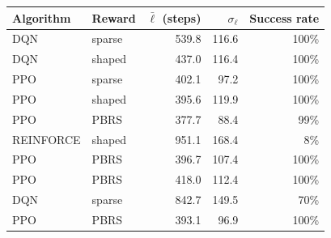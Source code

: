\begin{tabular}{llrrr}
\toprule
Algorithm & Reward & $\bar{\ell}$ (steps) & $\sigma_\ell$ & Success rate \\
\midrule
DQN & sparse & 539.8 & 116.6 & 100\% \\
DQN & shaped & 437.0 & 116.4 & 100\% \\
PPO & sparse & 402.1 & 97.2 & 100\% \\
PPO & shaped & 395.6 & 119.9 & 100\% \\
PPO & PBRS & 377.7 & 88.4 & 99\% \\
REINFORCE & shaped & 951.1 & 168.4 & 8\% \\
PPO & PBRS & 396.7 & 107.4 & 100\% \\
PPO & PBRS & 418.0 & 112.4 & 100\% \\
DQN & sparse & 842.7 & 149.5 & 70\% \\
PPO & PBRS & 393.1 & 96.9 & 100\% \\
\bottomrule
\end{tabular}
